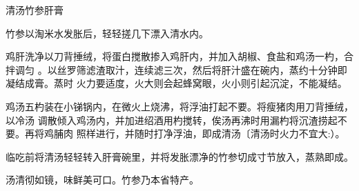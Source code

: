 \begin{recipe}{清汤竹参肝膏}

\ingredients


\cooking

竹参以淘米水发胀后，轻轻搓几下漂入清水内。

鸡肝洗净以刀背捶绒，将蛋白搅散掺入鸡肝内，并加入胡椒、食盐和鸡汤一杓，合拌调匀
。以丝罗筛滤渣取汁，连续滤三次，然后将肝汁盛在碗内，蒸约十分钟即凝结成膏。蒸时
火力要适度，火大则会起蜂窝眼，火小则引起沉淀，不能凝结。

鸡汤五杓装在小锑锅内，在微火上烧沸，将浮油打起不要。将瘦猪肉用刀背捶绒，以冷汤
调散倾入鸡汤内，并加进绍酒用杓搅转，俟汤再沸时用漏杓将沉渣捞起不要。再将鸡脯肉
照样进行，并随时打净浮油，即成清汤〔清汤时火力不宜大:）。

临吃前将清汤轻轻转入肝膏碗里，并将发胀漂净的竹参切成寸节放入，蒸熟即成。

\notes

汤清彻如镜，味鲜美可口。竹参乃本省特产。

\end{recipe}

